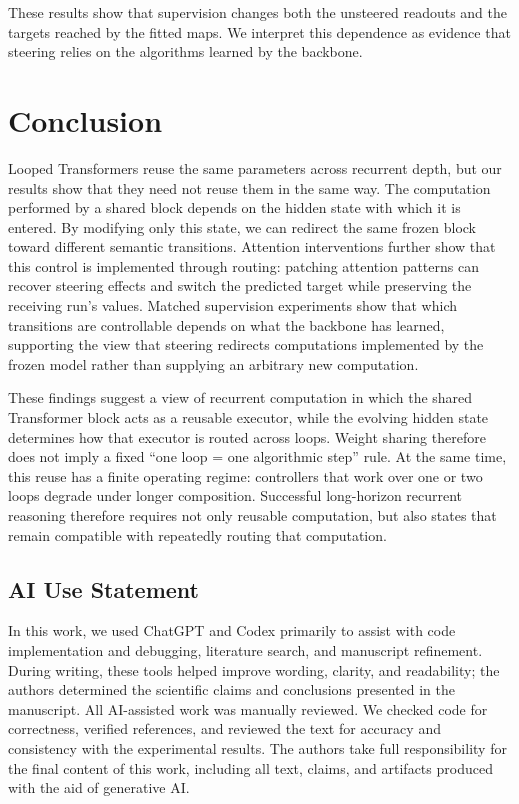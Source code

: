 \documentclass{article}
\begin{document}
These results show that supervision changes both the unsteered readouts and the targets reached by the fitted maps. We interpret this dependence as evidence that steering relies on the algorithms learned by the backbone.


\FloatBarrier
\section{Conclusion}
Looped Transformers reuse the same parameters across recurrent depth, but our results show that they need not reuse them in the same way. The computation performed by a shared block depends on the hidden state with which it is entered. By modifying only this state, we can redirect the same frozen block toward different semantic transitions. Attention interventions further show that this control is implemented through routing: patching attention patterns can recover steering effects and switch the predicted target while preserving the receiving run's values. Matched supervision experiments show that which transitions are controllable depends on what the backbone has learned, supporting the view that steering redirects computations implemented by the frozen model rather than supplying an arbitrary new computation.

These findings suggest a view of recurrent computation in which the shared Transformer block acts as a reusable executor, while the evolving hidden state determines how that executor is routed across loops. Weight sharing therefore does not imply a fixed ``one loop = one algorithmic step'' rule. At the same time, this reuse has a finite operating regime: controllers that work over one or two loops degrade under longer composition. Successful long-horizon recurrent reasoning therefore requires not only reusable computation, but also states that remain compatible with repeatedly routing that computation.

\subsection*{AI Use Statement}
In this work, we used ChatGPT and Codex primarily to assist with code implementation and debugging, literature search, and manuscript refinement. During writing, these tools helped improve wording, clarity, and readability; the authors determined the scientific claims and conclusions presented in the manuscript. All AI-assisted work was manually reviewed. We checked code for correctness, verified references, and reviewed the text for accuracy and consistency with the experimental results. The authors take full responsibility for the final content of this work, including all text, claims, and artifacts produced with the aid of generative AI.
\end{document}
